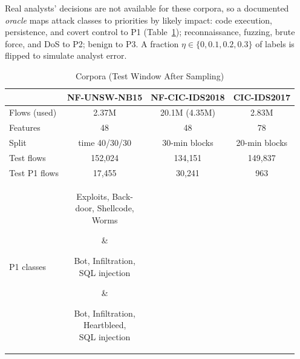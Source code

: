 \documentclass[journal]{IEEEtran}
\begin{document}
Real analysts' decisions are not available for these corpora, so a documented \emph{oracle} maps attack classes to priorities by likely impact: code execution, persistence, and covert control to P1 (Table~\ref{tab:data}); reconnaissance, fuzzing, brute force, and DoS to P2; benign to P3. A fraction $\eta\in\{0,0.1,0.2,0.3\}$ of labels is flipped to simulate analyst error.

\begin{table}[t]
\centering
\caption{Corpora (Test Window After Sampling)}
\label{tab:data}
\setlength{\tabcolsep}{2.5pt}
\footnotesize
\begin{tabular}{@{}lccc@{}}
\toprule
 & NF-UNSW-NB15 & NF-CIC-IDS2018 & CIC-IDS2017\\
\midrule
Flows (used)    & 2.37M & 20.1M (4.35M) & 2.83M\\
Features        & 48 & 48 & 78\\
Split           & time 40/30/30 & 30-min blocks & 20-min blocks\\
Test flows      & 152{,}024 & 134{,}151 & 149{,}837\\
Test P1 flows   & 17{,}455 & 30{,}241 & 963\\
P1 classes      & \parbox[t]{17mm}{\centering Exploits, Back-\\door, Shellcode,\\Worms} & \parbox[t]{17mm}{\centering Bot, Infiltration,\\SQL injection} & \parbox[t]{17mm}{\centering Bot, Infiltration,\\Heartbleed,\\SQL injection}\\
\bottomrule
\end{tabular}
\end{table}
\end{document}
